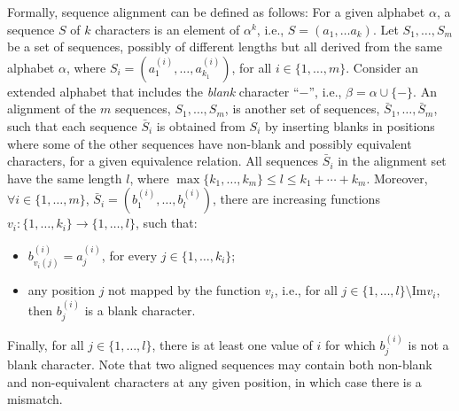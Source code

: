 Formally, sequence alignment can be defined as follows:
For a given alphabet $\alpha$, a sequence $S$ of $k$ characters is an element of
$\alpha^k$, i.e., $S = (a_1, \ldots a_k)$.
Let $S_1, \ldots, S_m$ be a set of sequences, possibly of different lengths but
all derived from the same alphabet $\alpha$, where
$S_i = (a_1^{(i)}, \ldots, a_{k_1}^{(i)})$, for all $i\in\{1,\ldots,m\}$.
Consider an extended alphabet that includes the \textit{blank} character ``$-$'',
i.e., $\beta = \alpha \cup \{-\}$.
An alignment of the $m$ sequences, $S_1, \ldots, S_m$, is another set of sequences,
$\bar{S}_1, \ldots, \bar{S}_m$, such that each sequence $\bar{S}_i$ is obtained
from $S_i$ by inserting blanks in positions where some of the other sequences
have non-blank and possibly equivalent characters, for a given equivalence relation.
All sequences $\bar{S}_i$ in the alignment set have the same length $l$, where
$\max\{k_1,\ldots,k_m\} \leq l \leq k_1 + \cdots + k_m$.
Moreover, $\forall i\in\{1,\ldots, m\}$, $\bar{S}_i = (b_1^{(i)},\ldots,b_l^{(i)})$,
there are increasing functions $v_i: \{1,\ldots,k_i\} \to \{1,\ldots,l\}$, such that:
\begin{itemize}[noitemsep,topsep=0pt]
\item $b_{v_i(j)}^{(i)} = a_j^{(i)}$, for every $j \in \{1,\ldots,k_i\}$;
\item any position $j$ not mapped by the function $v_i$, i.e.,
for all $j \in \{1,\ldots,l\}\setminus \textrm{Im} v_i$,
then $b_j^{(i)}$ is a blank character.
\end{itemize}
Finally, for all $j\in\{1,\ldots,l\}$, there is at least one value of $i$ for
which $b_j^{(i)}$ is not a blank character.
Note that two aligned sequences may contain both non-blank and non-equivalent characters at any given position, in which case there is a mismatch.



